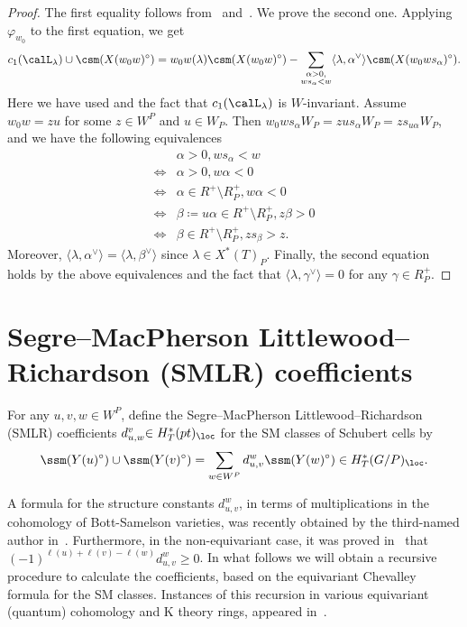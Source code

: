 \begin{proof}
	The first equality follows from~\cite[Theorem 3.7]{su:quantum} and~\cite{AMSS:shadows}. We prove the second one. Applying $\varphi_{w_0}$ to the first equation, we get
	\[c_1(\calL_\lambda)\cup \csm (X(w_0w)^\circ)=w_0w(\lambda) \csm (X(w_0w)^\circ)-\sum_{\substack{\alpha>0,\\ws_\alpha <w}}\langle\lambda,\alpha^\vee\rangle \csm (X(w_0ws_\alpha)^\circ).\]
	Here we have used  and the fact that $c_1(\calL_\lambda)$ is $W$-invariant. 
	Assume $w_0w=zu$ for some $z\in W^P$ and $u\in W_P$. Then $w_0ws_\alpha W_P=zus_\alpha W_P=zs_{u\alpha}W_P$, and we have the following equivalences
	\begin{align*}
		&\alpha>0, ws_\alpha <w\\
		\Leftrightarrow&\alpha>0, w\alpha<0\\
		\Leftrightarrow&\alpha\in R^+\setminus R^+_P, w\alpha<0\\
		\Leftrightarrow&\beta\coloneqq u\alpha\in R^+\setminus R^+_P, z\beta>0\\
		\Leftrightarrow&\beta\in R^+\setminus R^+_P, zs_\beta>z.
	\end{align*}
	Moreover, $\langle\lambda,\alpha^\vee\rangle=\langle\lambda,\beta^\vee\rangle$ since $\lambda\in X^*(T)_P$.
	Finally, the second equation holds by the above equivalences and the fact that $\langle\lambda,\gamma^\vee\rangle=0$ for any $\gamma\in R^+_P$.
\end{proof}

\section{Segre--MacPherson Littlewood--Richardson (SMLR) coefficients}
For any $u,v,w\in W^P$, define the Segre--MacPherson Littlewood--Richardson (SMLR) coefficients 
$d_{u,w}^{v} {\in H^*_T(pt)_{\loc}}$ for the SM classes of Schubert cells by
\begin{equation}\label{equ:CSMLR}
	\ssm({Y(u)^\circ}) \cup \ssm({Y(v)^\circ}) =\sum_{w\in W^P} d_{u,v}^{w}\ssm({Y(w)^\circ})\in {
		H_T^*(G/P)_{\loc}} \/.
\end{equation}

A formula for the structure constants $d_{u,v}^{w}$, in terms of multiplications in the cohomology
of Bott-Samelson varieties, 
was recently obtained by the third-named author in~\cite[Theorem 5.2]{su:structure}. 
Furthermore, in the non-equivariant case, it was proved in~\cite{schurmann.simpson.wang} 
that $(-1)^{\ell(u)+\ell(v)-\ell(w)}d_{u,v}^w \ge 0$.
In what follows we will obtain a recursive procedure to calculate the coefficients, based on the
equivariant Chevalley formula for the SM classes. Instances of this
recursion in various equivariant (quantum) cohomology 
and K theory rings,
appeared in~\cite{molev.sagan:Littlewood-Richardson,knutson.tao:puzzles,mihalcea:eqqgr,mihalcea:eqqhom,naruse2014schubert,BCMP:QKChev,naruse2019skew}. 

